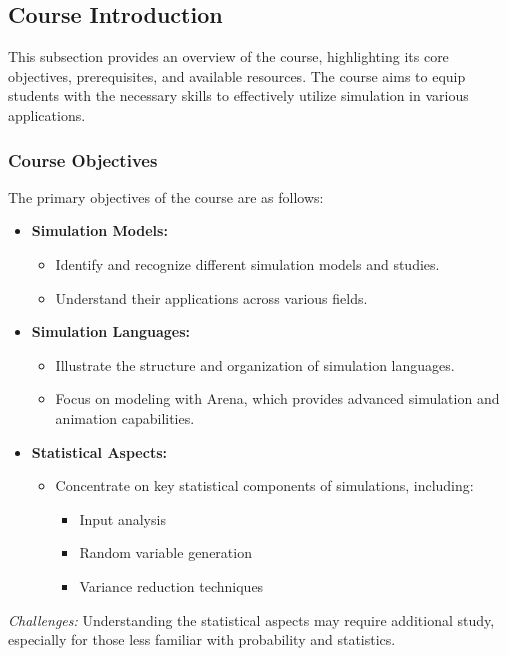 
\subsection{Course Introduction}

This subsection provides an overview of the course, highlighting its core objectives, prerequisites, and available resources. The course aims to equip students with the necessary skills to effectively utilize simulation in various applications.

\subsubsection{Course Objectives}
The primary objectives of the course are as follows:
\begin{itemize}
    \item \textbf{Simulation Models:} 
    \begin{itemize}
        \item Identify and recognize different simulation models and studies.
        \item Understand their applications across various fields.
    \end{itemize}
    \item \textbf{Simulation Languages:} 
    \begin{itemize}
        \item Illustrate the structure and organization of simulation languages.
        \item Focus on modeling with Arena, which provides advanced simulation and animation capabilities.
    \end{itemize}
    \item \textbf{Statistical Aspects:} 
    \begin{itemize}
        \item Concentrate on key statistical components of simulations, including:
        \begin{itemize}
            \item Input analysis
            \item Random variable generation
            \item Variance reduction techniques
        \end{itemize}
    \end{itemize}
\end{itemize}

\textit{Challenges:} Understanding the statistical aspects may require additional study, especially for those less familiar with probability and statistics.

